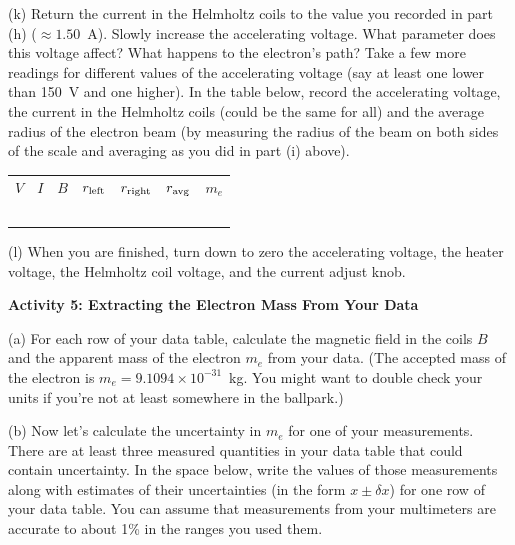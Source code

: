  (k) Return the current in the Helmholtz coils to the value you recorded in 
part (h) ($\approx 1.50$~A). Slowly increase the accelerating voltage. What parameter 
does this voltage affect? What happens to the electron's path?
Take a few more readings for different values of the accelerating voltage (say at least one lower than 150~V
 and one higher).  In the table below, record the accelerating voltage, the current in the 
Helmholtz coils (could be the same for all) 
and the average radius of the electron beam (by measuring the radius of the 
beam on both sides of the scale and averaging as you did in part (i) above). 

\begin{center}
{\renewcommand{\arraystretch}{1.8}
\begin{tabular}{|*{7}{ C{0.75in} |}}
\hline
$V$ & $I$ & $B$ & $r_{\rm left}$ & $r_{\rm right}$ & $r_{\rm avg}$ & $m_e$  \\ 
\hhline{|=|=|=|=|=|=|=|}
& & & & & & \\ \hline
& & & & & & \\ \hline
& & & & & & \\ \hline
& & & & & & \\ \hline
& & & & & & \\ \hline
\end{tabular}
}
\end{center}
\newpage

(l) When you are finished, turn down to zero the accelerating voltage, the 
heater voltage, the Helmholtz coil voltage, and the current adjust knob.
\vspace{10mm}

\textbf{Activity 5: Extracting the Electron Mass From Your Data}

(a) For each row of your data table, calculate the magnetic field in the coils $B$ and the apparent mass of the electron $m_e$ from your data.  (The accepted mass of the electron is $m_e = 9.1094 \times 10^{-31}$~kg.  You might want to double check your units if you're not at least somewhere in the ballpark.)
\answerspace{1.5in}

(b) Now let's calculate the uncertainty in $m_e$ for one of your measurements.  There are at least three measured quantities in your data table that could contain uncertainty.  In the space below, write the values of those measurements along with estimates of their uncertainties (in the form $x \pm \delta x$) for one row of your data table.  You can assume that measurements from your multimeters are accurate to about 1\% in the ranges you used them.
\answerspace{1.5in}

